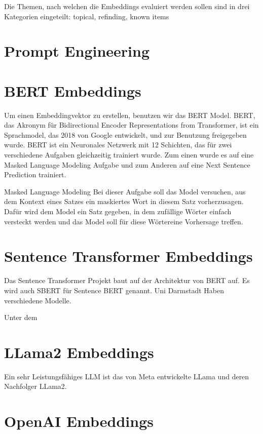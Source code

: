Die Themen, nach welchen die Embeddings evaluiert werden sollen sind in drei Kategorien eingeteilt:
topical, refinding, known items \cite{jones2021}

\section{Prompt Engineering}


\section{BERT Embeddings}

Um einen Embeddingvektor zu erstellen, benutzen wir das BERT Model. BERT, das Akronym für Bidirectional Encoder Representations from Transformer, ist ein Sprachmodel, das 2018 von Google entwickelt, und zur Benutzung freigegeben wurde. 
BERT ist ein Neuronales Netzwerk mit 12 Schichten, das für zwei verschiedene Aufgaben gleichzeitig trainiert wurde. Zum einen wurde es auf eine Masked Language Modeling Aufgabe und zum Anderen auf eine Next Sentence Prediction trainiert. 

Masked Language Modeling
Bei dieser Aufgabe soll das Model versuchen, aus dem Kontext eines Satzes ein maskiertes Wort in diesem Satz vorherzusagen. Dafür wird dem Model ein Satz gegeben, in dem zufällige Wörter einfach versteckt werden und das Model soll für diese Wörtereine Vorhersage treffen. 


\section{Sentence Transformer Embeddings}

Das Sentence Transformer Projekt baut auf der Architektur von BERT auf. 
Es wird auch SBERT für Sentence BERT genannt. 
Uni Darmstadt
Haben verschiedene Modelle.

Unter dem 

\section{LLama2 Embeddings}

Ein sehr Leistungsfähiges LLM ist das von Meta entwickelte LLama und deren Nachfolger LLama2. \cite{touvron2023}

\section{OpenAI Embeddings}

